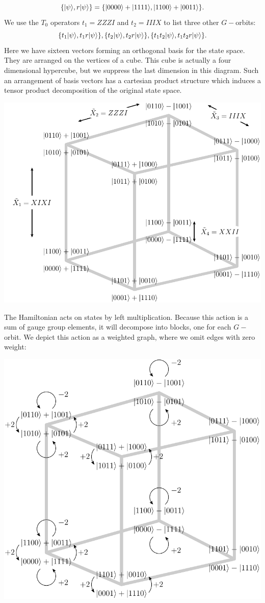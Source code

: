 \documentclass[12pt]{article}
\begin{document}
$$
\{|{\psi}\rangle, r|{\psi}\rangle\} = \{|{0000}\rangle+|{1111}\rangle, |{1100}\rangle+|{0011}\rangle\}.
$$
We use the $T_0$ operators $t_1=ZZZI$ and $t_2=IIIX$
to list three other $G-$orbits:
$$
\{t_1 |{\psi}\rangle, t_1 r|{\psi}\rangle\}, 
\{t_2 |{\psi}\rangle, t_2 r|{\psi}\rangle\}, 
\{t_1 t_2 |{\psi}\rangle, t_1 t_2 r|{\psi}\rangle\}.
$$
Here we have sixteen vectors forming an orthogonal basis for the state space.
They are arranged on the vertices of a cube. This cube is actually a four
dimensional hypercube, but we suppress the last dimension in
this diagram.
Such an arrangement of basis vectors has a cartesian product
structure which induces a tensor product decomposition of
the original state space.
\begin{center}
\includegraphics[width=0.9\columnwidth]{pic-operators.pdf}
\end{center}
The Hamiltonian acts on states by left multiplication.
Because this action
is a sum of gauge group elements,
it will decompose into blocks,
one for each $G-$orbit.
We depict this action as a weighted graph, where we omit edges
with zero weight:
\begin{center}
\includegraphics[width=0.9\columnwidth]{pic-orbit.pdf}
\end{center}
\end{document}
